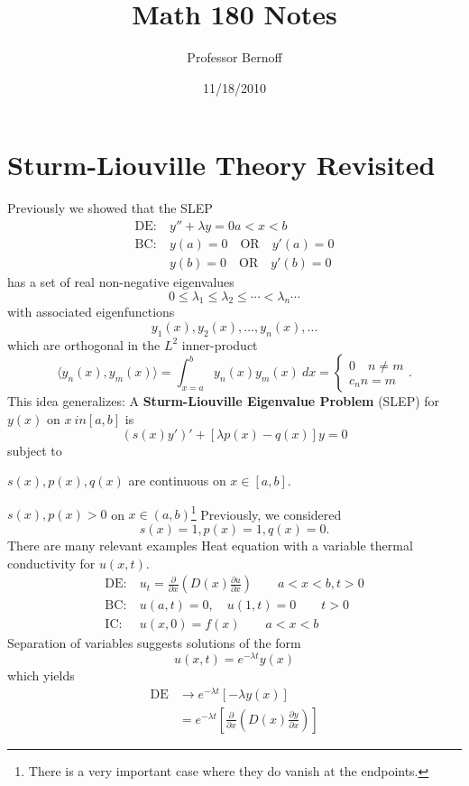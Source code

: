 \documentclass[cm]{article}
\title{Math 180 Notes}
\author{Professor Bernoff}
\date{11/18/2010}
\begin{document}
\section{Sturm-Liouville Theory Revisited}
Previously we showed that the SLEP
\begin{align*}
\text{DE:}&~y'' + \lambda y = 0 a < x < b\\
\text{BC:}&~ y(a) = 0 \quad \text{OR} \quad y'(a) = 0 \\
    &~ y(b) = 0 \quad \text{OR} \quad y'(b) = 0
\end{align*}
has a set of real non-negative eigenvalues
$$ 0 \leq \lambda_1 \leq \lambda_2 \leq \cdots < \lambda_n \cdots$$
with associated eigenfunctions
$$y_1(x), y_2(x), \ldots, y_n(x),\ldots$$
which are orthogonal in the $L^2$ inner-product
$$\langle y_n(x), y_m(x)\rangle = \int_{x=a}^b y_n(x) y_m(x)~dx = \begin{cases}
0 \quad n \neq m \\ c_n n = m \end{cases}.$$
This idea generalizes:
A {\bf Sturm-Liouville Eigenvalue Problem} (SLEP) for $y(x)$ on $x \ in [a,b]$
is
\begin{equation*}
(s(x)y')' + [\lambda p(x) - q(x)]y = 0 \tag{SLEP}
\end{equation*}
subject to
\enum
\item $s(x), p(x), q(x)$ are continuous on $x \in [a,b]$.
\item $s(x), p(x) > 0$ on $x \in (a,b)$\footnote{There is a very important case
where they do vanish at the endpoints.}
\xenum
\xdefn
\nt
Previously, we considered
$$s(x) = 1, p(x) = 1, q(x) = 0.$$
\xnt
There are many relevant examples
\ex
Heat equation with a variable thermal conductivity for $u(x,t)$.
\begin{align*}
\text{DE:}&~ u_t = \frac{\partial}{\partial x} \left( D(x) \frac{\partial
    u}{\partial x} \right) \qquad a < x < b, t > 0 \\
\text{BC:}&~ u(a,t) = 0, \quad u(1,t) = 0 \qquad t > 0 \\
\text{IC:}&~ u(x,0) = f(x) \qquad a < x < b
\end{align*}
Separation of variables suggests solutions of the form
$$u(x,t) = e^{-\lambda t} y(x)$$
which yields
\begin{align*}
\text{DE} &\to e^{-\lambda t}[- \lambda y(x) ] \\
        &= e^{- \lambda t}\left[\frac{\partial}{\partial x}\left(D(x) \frac{\partial
                y}{\partial x}\right)\right]
\end{align*}
\end{document}
